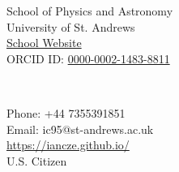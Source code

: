 \parbox[t]{3in}{
\begin{flushleft}
School of Physics and Astronomy\\
University of St. Andrews\\
\href{https://www.st-andrews.ac.uk/physics-astronomy/people/ic95/}{School Website} \\
ORCID ID: \href{http://orcid.org/0000-0002-1483-8811}{0000-0002-1483-8811} \\
\end{flushleft}} \ \hfill  \
\parbox[t]{3in}{
\begin{flushright}
Phone: +44 7355391851\\
Email: ic95@st-andrews.ac.uk\\
\url{https://iancze.github.io/}\\
U.S. Citizen
\end{flushright}}
